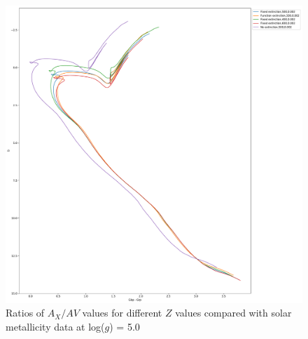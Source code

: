 \documentclass[a4paper, 11pt, oneside]{LJMU_Astro_Thesis}  %
\begin{document}
\begin{figure}[h]
\begin{center}
\includegraphics[scale=0.3]{../basti_isochrones_10_13Gyr/Extinction_T5k_FeH0fix_func_G_GbpmGrp_500_400_600_Myr_FeH_0p002_ref_noext_Av_1p0.pdf}
\caption{Ratios of $A_{X}/A{V}$ values for different $Z$ values compared with solar metallicity data at log($g$) = 5.0}
\label{gaia_isoc_T5k}
\end{center}
\end{figure}
\end{document}
